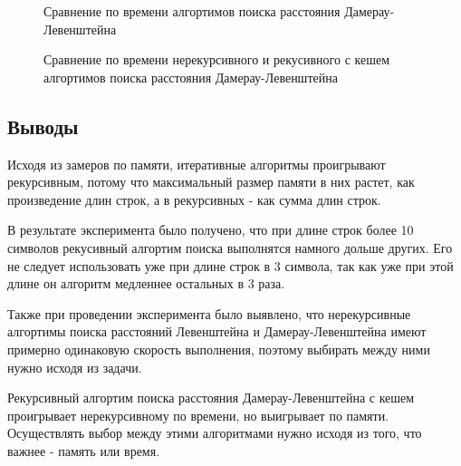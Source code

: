 \begin{figure}[!h]
	\centering
    \def\svgscale{0.5}
	
	\caption{Сравнение по времени алгортимов поиска расстояния Дамерау-Левенштейна}
	\label{fig:r3}
\end{figure}

\begin{figure}[!h]
	\centering
    \def\svgscale{0.5}
	
	\caption{Сравнение по времени нерекурсивного и рекусивного с кешем алгортимов поиска расстояния Дамерау-Левенштейна}
	\label{fig:r4}
\end{figure}
\pagebreak
\pagebreak

\subsection{Выводы}
Исходя из замеров по памяти, итеративные алгоритмы проигрывают рекурсивным, 
потому что максимальный размер памяти в них растет, как произведение длин строк, а в рекурсивных - как сумма длин строк.

В результате эксперимента было получено, что при длине строк более 10 символов рекусивный алгортим поиска выполнятся намного
дольше других. Его не следует использовать уже при длине строк в 3 символа, так как уже при этой длине он алгоритм медленнее остальных в 3 раза.

Также при проведении эксперимента было выявлено, что нерекурсивные алгортимы поиска расстояний Левенштейна и Дамерау-Левенштейна
имеют примерно одинаковую скорость выполнения, поэтому выбирать между ними нужно исходя из задачи.

Рекурсивный алгортим поиска расстояния Дамерау-Левенштейна с кешем проигрывает нерекурсивному по времени, но выигрывает по памяти.
Осуществлять выбор между этими алгоритмами нужно исходя из того, что важнее - память или время.

\pagebreak
